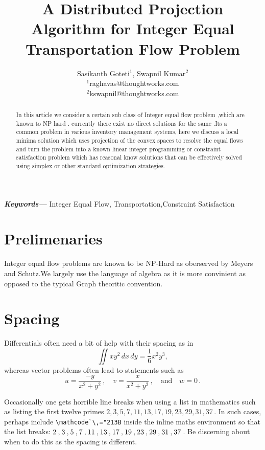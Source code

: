 \documentclass[a4paper]{article}
\title{A Distributed Projection Algorithm for Integer Equal Transportation Flow Problem}
\author{Sasikanth Goteti$^{1}$, Swapnil Kumar$^{2}$  \\
            \small $^{1}$raghavas@thoughtworks.com \\
            \small $^{2}$kswapnil@thoughtworks.com \\
    }
\date{} %
\providecommand{\keywords}[1]
    {
      \small	
      \textbf{\textit{Keywords---}} #1
    }
\begin{document}
    \maketitle
    
    \begin{abstract}
        In this article we consider a certain sub class of Integer equal flow problem ,which are known to NP hard \cite{meyers}. 
        currently there exist no direct solutions for the same .Its a common problem in various inventory management systems,
        here we discuss a local minima solution which uses projection of the convex spaces to resolve the equal flows and turn 
        the problem into a known linear integer programming or constraint satisfaction problem which has reasonal know solutions that can be 
        effectively solved using simplex or other standard optimization strategies.
       \end{abstract}
       \keywords{Integer Equal Flow, Transportation,Constraint Satisfaction}
     
       \maketitle
    

    
    
    
    \section{Prelimenaries}
    Integer equal flow problems are known to be NP-Hard as oberserved by Meyers and Schutz\cite{meyers}.We largely use the
    language of algebra as it is more convinient as opposed to the typical Graph theoritic convention. 
    
    
    
    
    
    
    \section{Spacing}
    
    Differentials often need a bit of help with their spacing as in
    \[
        \iint xy^2\,dx\,dy 
        =\frac{1}{6}x^2y^3,
    \]
    whereas vector problems often lead to statements such as
    \[
        u=\frac{-y}{x^2+y^2}\,,\quad
        v=\frac{x}{x^2+y^2}\,,\quad\text{and}\quad
        w=0\,.
    \]

    Occasionally one gets horrible line breaks when using a list in mathematics such as 
    listing the first twelve primes  \(2,3,5,7,11,13,17,19,23,29,31,37\)\,.
    In such cases, perhaps include \verb|\mathcode`\,="213B| inside the inline maths environment so that the list breaks: \(\mathcode`\,="213B 2,3,5,7,11,13,17,19,23,29,31,37\)\,.
    Be discerning about when to do this as the spacing is different.
    
\end{document}
